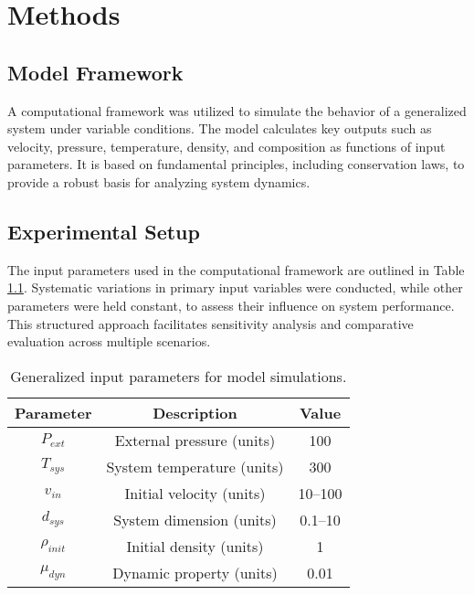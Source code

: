 \chapter{Methods}

\fancyfoot[C]{\thepage}

\section{Model Framework}
    A computational framework was utilized to simulate the behavior of a generalized system under variable conditions. The model calculates key outputs such as velocity, pressure, temperature, density, and composition as functions of input parameters. It is based on fundamental principles, including conservation laws, to provide a robust basis for analyzing system dynamics.

\section{Experimental Setup}
    The input parameters used in the computational framework are outlined in Table \ref{table: model inputs}. Systematic variations in primary input variables were conducted, while other parameters were held constant, to assess their influence on system performance. This structured approach facilitates sensitivity analysis and comparative evaluation across multiple scenarios.
    \begin{table}[ht]
        \centering
        \begin{tabular}{|c c c|}
        \hline
        Parameter & Description & Value \\ [0.5ex]
        \hline
        $P_{ext}$ & External pressure (units) & 100 \\ [6pt]
        $T_{sys}$ & System temperature (units) & 300 \\ [6pt]
        $v_{in}$ & Initial velocity (units) & 10--100 \\ [6pt]
        $d_{sys}$ & System dimension (units) & 0.1--10 \\ [6pt]
        $\rho_{init}$ & Initial density (units) & 1 \\ [6pt]
        $\mu_{dyn}$ & Dynamic property (units) & 0.01 \\ [1ex]
        \hline
        \end{tabular}
        \caption[Input Parameters for Model Simulations]{Generalized input parameters for model simulations.}
        \label{table: model inputs}
    \end{table}

